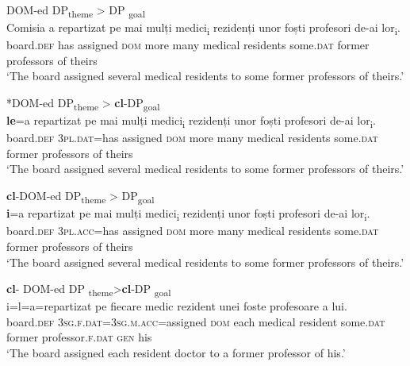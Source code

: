 \documentclass[output=paper,colorlinks,citecolor=brown,nonflat]{langsci/langscibook}
\begin{document}
\ea%
    \label{ex:cornilescu:3}
    DOM-ed DP\textsubscript{theme} > DP \textsubscript{goal}\\
    \gll Comisia {a} {repartizat} {pe} {mai} {mulți} {medici\textsubscript{i}} {rezidenți} {unor} {foști} {profesori} {de-ai} {lor\textsubscript{i}}.\\
        board.\textsc{def} has assigned \textsc{dom} more many medical residents some.\textsc{dat} former professors of theirs\\
    \glt ‘The board assigned several medical residents to some former professors of theirs.’
    \z

\newpage

\ea%
    \label{ex:cornilescu:4}
    *DOM-ed DP\textsubscript{theme} > \textbf{cl}-DP\textsubscript{goal}\\
     \textbf{{le}}{=a} {repartizat} {pe} {mai} {mulți} {medici\textsubscript{i}} {rezidenți} {unor} {foști} {profesori} {de-ai} {lor\textsubscript{i}}.\\
        board.\textsc{def}  \textsc{3pl.dat}=has assigned  \textsc{dom} more many medical residents some.\textsc{dat} former professors of theirs\\
    \glt ‘The board assigned several medical residents to some former professors of theirs.’
    \z



\ea%
    \label{ex:cornilescu:5}
    \textbf{cl}-DOM-ed DP\textsubscript{theme} > DP\textsubscript{goal}\\
     \textbf{{i}}{=a} {repartizat} {pe} {mai} mulți {medici\textsubscript{i}} {rezidenți} {unor} {foști} {profesori} {de-ai} {lor\textsubscript{i}}.\\
		board.\textsc{def} \textsc{3pl.acc=}has assigned \textsc{dom} more many medical residents some.\textsc{dat} former professors of theirs\\
    \glt ‘The board assigned several medical residents to some former professors of theirs.’
    \z




\ea%
    \label{ex:cornilescu:6}
    \textbf{cl}- DOM-ed DP \textsubscript{theme}>\textbf{cl}{}-DP \textsubscript{goal} \\
     {i=l=a=repartizat} {pe} {fiecare} {medic} {rezident} {unei} {foste} {profesoare} {a} {lui}.\\
       board.\textsc{def} \textsc{3sg.f.dat}=\textsc{3sg.m.acc}=assigned \textsc{dom} each medical resident some.\textsc{dat} former professor.\textsc{f}.\textsc{dat} \textsc{gen} his\\
    \glt ‘The board assigned each resident doctor to a former professor of his.’
    \z
\end{document}
